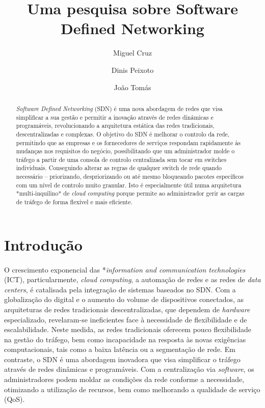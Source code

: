 \documentclass{llncs}
\begin{document}
\mainmatter
\title{Uma pesquisa sobre Software Defined Networking}


\author{Miguel Cruz \and Dinis Peixoto \and João Tomás}



\date{}

\maketitle
\begin{abstract}
    \textit {Software Defined Networking} (SDN) é uma nova abordagem de redes que visa simplificar a sua gestão e permitir a inovação através de redes dinâmicas e programáveis,  revolucionando a arquitetura estática das redes tradicionais, descentralizadas e complexas. 
    O objetivo do SDN é melhorar o controlo da rede, permitindo que as empresas e os fornecedores de serviços respondam rapidamente às mudanças nos requisitos do negócio, possibilitando que um administrador molde o tráfego a partir de uma consola de controlo centralizada sem tocar em switches individuais. Conseguindo alterar as regras de qualquer switch de rede quando necessário – priorizando, despriorizando ou até mesmo bloqueando pacotes específicos com um nível de controlo muito granular.
    Isto é especialmente útil numa arquitetura *multi-inquilino* de \textit {cloud computing}  porque permite ao administrador gerir as cargas de tráfego de forma flexível e mais eficiente.
\end{abstract}

\section{Introdução}

\paragraph{} O crescimento exponencial das *\textit {information and communication technologies} (ICT), particularmente, \textit {cloud computing}, a automação de redes e as redes de \textit {data centers}, é catalisada pela integração de sistemas baseados no SDN. \cite{paper1}
 Com a globalização do digital e o aumento do volume de dispositivos conectados, as arquiteturas de redes tradicionais descentralizadas, que dependem de \textit {hardware} especializado, revelaram-se ineficientes face à necessidade de flexibilidade e de escalabilidade. 
 Neste medida, as redes tradicionais oferecem pouco flexibilidade na gestão do tráfego, bem como incapacidade na resposta às novas exigências computacionais, tais como a baixa latência ou a segmentação de rede. 
 Em contraste, o SDN é uma abordagem inovadora que visa simplificar o tráfego através de redes dinâmicas e programáveis. 
 Com a centralização via \textit {software}, os administradores podem moldar as condições da rede conforme a necessidade, otimizando a utilização de recursos, bem como melhorando a qualidade de serviço (QoS).
\end{document}
